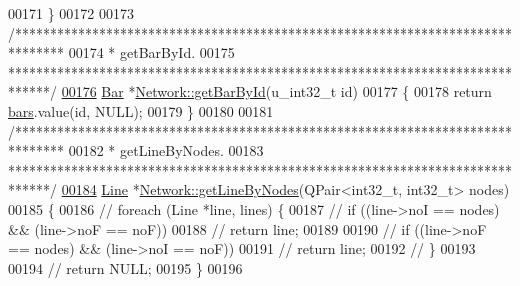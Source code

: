 \begin{DoxyCode}
00171 \}
00172 
00173 \textcolor{comment}{/*******************************************************************************}
00174 \textcolor{comment}{ * getBarById.}
00175 \textcolor{comment}{ ******************************************************************************/}
\hypertarget{network_8cpp_source_l00176}{}\hyperlink{group___graphics_ga9c5806f5a0d236bb6d8abbdce62d9675}{00176} \hyperlink{class_bar}{Bar} *\hyperlink{group___graphics_ga9c5806f5a0d236bb6d8abbdce62d9675}{Network::getBarById}(u\_int32\_t \textcolor{keywordtype}{id})
00177 \{
00178   \textcolor{keywordflow}{return} \hyperlink{class_network_a7fe628f7de34a96235cbd3f2cee4aff2}{bars}.value(\textcolor{keywordtype}{id}, NULL);
00179 \}
00180 
00181 \textcolor{comment}{/*******************************************************************************}
00182 \textcolor{comment}{ * getLineByNodes.}
00183 \textcolor{comment}{ ******************************************************************************/}
\hypertarget{network_8cpp_source_l00184}{}\hyperlink{group___graphics_ga8f090b85a7779695cb9f05b6395b3044}{00184} \hyperlink{class_line}{Line} *\hyperlink{group___graphics_ga8f090b85a7779695cb9f05b6395b3044}{Network::getLineByNodes}(QPair<int32\_t, int32\_t> nodes)
00185 \{
00186 \textcolor{comment}{//  foreach (Line *line, lines) \{}
00187 \textcolor{comment}{//    if ((line->noI == nodes) && (line->noF == noF))}
00188 \textcolor{comment}{//      return line;}
00189 
00190 \textcolor{comment}{//    if ((line->noF == nodes) && (line->noI == noF))}
00191 \textcolor{comment}{//      return line;}
00192 \textcolor{comment}{//  \}}
00193 
00194 \textcolor{comment}{//  return NULL;}
00195 \}
00196 
\end{DoxyCode}
